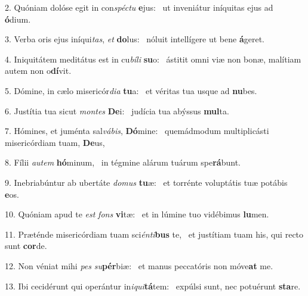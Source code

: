 2. Quóniam dolóse egit in con\textit{spéc}\textit{tu} \textbf{e}jus: \ast\  ut inveniátur iníquitas ejus ad \textbf{ó}dium.\

3. Verba oris ejus iníqui\textit{tas}, \textit{et} \textbf{do}lus: \ast\  nóluit intellígere ut bene \textbf{á}geret.\

4. Iniquitátem meditátus est in cu\textit{bí}\textit{li} \textbf{su}o: \ast\  ástitit omni viæ non bonæ, malítiam autem non o\textbf{dí}vit.\

5. Dómine, in cælo misericór\textit{di}\textit{a} \textbf{tu}a: \ast\  et véritas tua usque ad \textbf{nu}bes.\

6. Justítia tua sicut \textit{mon}\textit{tes} \textbf{De}i: \ast\  judícia tua abýssus \textbf{mul}ta.\

7. Hómines, et juménta sal\textit{vá}\textit{bis}, \textbf{Dó}mine: \ast\  quemádmodum multiplicásti misericórdiam tuam, \textbf{De}us,\

8. Fílii \textit{au}\textit{tem} \textbf{hó}minum, \ast\  in tégmine alárum tuárum spe\textbf{rá}bunt.\

9. Inebriabúntur ab ubertáte \textit{do}\textit{mus} \textbf{tu}æ: \ast\  et torrénte voluptátis tuæ potábis \textbf{e}os.\

10. Quóniam apud te \textit{est} \textit{fons} \textbf{vi}tæ: \ast\  et in lúmine tuo vidébimus \textbf{lu}men.\

11. Præténde misericórdiam tuam sci\textit{én}\textit{ti}\textbf{bus} te, \ast\  et justítiam tuam his, qui recto sunt \textbf{cor}de.\

12. Non véniat mihi \textit{pes} \textit{su}\textbf{pér}biæ: \ast\  et manus peccatóris non móve\textbf{at} me.\

13. Ibi cecidérunt qui operántur in\textit{i}\textit{qui}\textbf{tá}tem: \ast\  expúlsi sunt, nec potuérunt \textbf{sta}re.\

